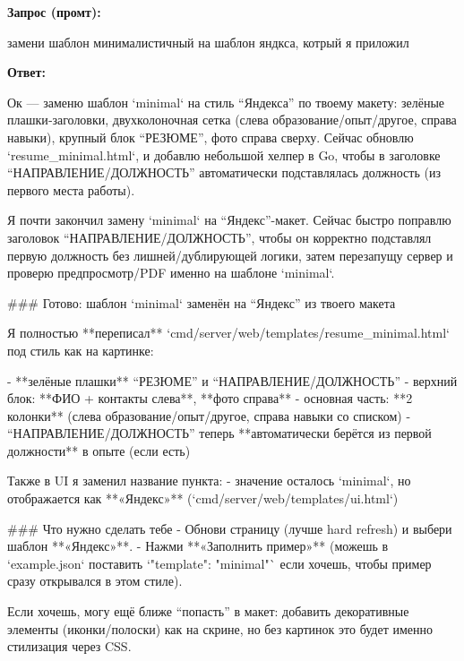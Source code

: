 \documentclass[a4paper, 14pt]{extarticle} %
\begin{document}
\textbf{Запрос (промт):}

\begin{PromptBlock}

замени шаблон минималистичный на шаблон яндкса, котрый я приложил

\end{PromptBlock}

\textbf{Ответ:}

\begin{AnswerBlock}

Ок — заменю шаблон `minimal` на стиль “Яндекса” по твоему макету: зелёные плашки‑заголовки, двухколоночная сетка (слева образование/опыт/другое, справа навыки), крупный блок “РЕЗЮМЕ”, фото справа сверху. Сейчас обновлю `resume_minimal.html`, и добавлю небольшой хелпер в Go, чтобы в заголовке “НАПРАВЛЕНИЕ/ДОЛЖНОСТЬ” автоматически подставлялась должность (из первого места работы).

Я почти закончил замену `minimal` на “Яндекс”-макет. Сейчас быстро поправлю заголовок “НАПРАВЛЕНИЕ/ДОЛЖНОСТЬ”, чтобы он корректно подставлял первую должность без лишней/дублирующей логики, затем перезапущу сервер и проверю предпросмотр/PDF именно на шаблоне `minimal`.

### Готово: шаблон `minimal` заменён на “Яндекс” из твоего макета

Я полностью **переписал** `cmd/server/web/templates/resume_minimal.html` под стиль как на картинке:

- **зелёные плашки** “РЕЗЮМЕ” и “НАПРАВЛЕНИЕ/ДОЛЖНОСТЬ”
- верхний блок: **ФИО + контакты слева**, **фото справа**
- основная часть: **2 колонки** (слева образование/опыт/другое, справа навыки со списком)
- “НАПРАВЛЕНИЕ/ДОЛЖНОСТЬ” теперь **автоматически берётся из первой должности** в опыте (если есть)

Также в UI я заменил название пункта:
- значение осталось `minimal`, но отображается как **«Яндекс»** (`cmd/server/web/templates/ui.html`)

### Что нужно сделать тебе
- Обнови страницу (лучше hard refresh) и выбери шаблон **«Яндекс»**.
- Нажми **«Заполнить пример»** (можешь в `example.json` поставить `"template": "minimal"` если хочешь, чтобы пример сразу открывался в этом стиле).

Если хочешь, могу ещё ближе “попасть” в макет: добавить декоративные элементы (иконки/полоски) как на скрине, но без картинок это будет именно стилизация через CSS.

\end{AnswerBlock}
\end{document}

